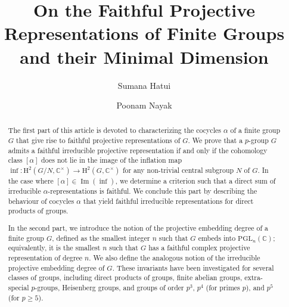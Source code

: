 \documentclass[a4paper,11pt]{amsart}
\title[On the Faithful Projective Representations of Finite Groups]
{On the Faithful Projective Representations of Finite Groups and their Minimal Dimension}
\author{Sumana Hatui} \author{Poonam Nayak}
\numberwithin{equation}{section}
\numberwithin{equation}{subsection}
\newcommand{\C}{\mathbb{C}}
\newcommand{\PGL}{\mathrm{PGL}}
\begin{document}
	
	\begin{abstract}
		The first part of this article is devoted to characterizing the cocycles $\alpha$ of a finite group $G$ that give rise to faithful projective representations of $G$. 
		We prove that a $p$-group $G$ admits a faithful irreducible projective representation if and only if the cohomology class $[\alpha]$ does not lie in the image of the inflation map
		$\inf: \mathrm{H}^2\!\left(G / N, \mathbb{C}^{\times}\right) \longrightarrow \mathrm{H}^2\!\left(G, \mathbb{C}^{\times}\right)$
		for any non-trivial central subgroup $N$ of $G$.
		In the case where $[\alpha] \in \operatorname{Im}(\operatorname{inf})$, we determine a criterion such that a direct sum of irreducible $\alpha$-representations is faithful. We conclude this part by describing the behaviour of cocycles $\alpha$ that yield faithful irreducible representations for direct products of groups.
		
		In the second part, we introduce the notion of the projective embedding degree of a finite group $G$, defined as the smallest integer $n$ such that $G$ embeds into $\PGL_n(\C)$; equivalently, it is the smallest $n$ such that $G$ has a faithful complex projective representation of degree $n$. We also define the analogous notion of the irreducible projective embedding degree of $G$. These invariants have been investigated for several classes of groups, including direct products of groups, finite abelian groups, extra-special $p$-groups, Heisenberg groups, and groups of order $p^3$, $p^4$ (for primes $p$), and $p^5$ (for $p \geq 5$). 
		
		
		
	\end{abstract}
	
\end{document}
